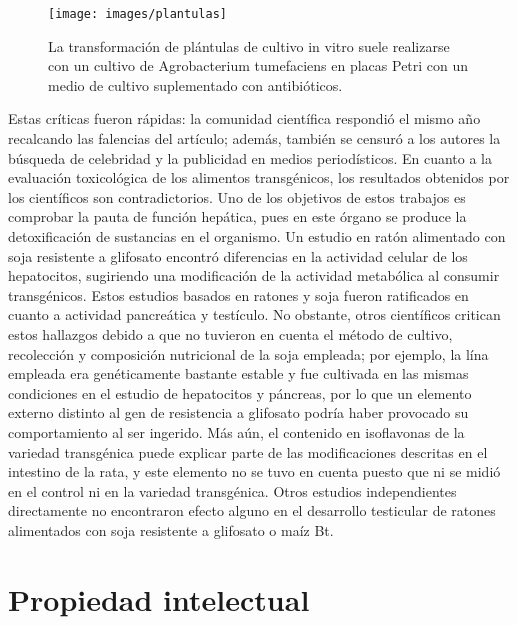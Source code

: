 \documentclass[11pt,a4paper]{article}
\begin{document}
\begin{wrapfigure}{O}{6cm}
\centering
\texttt{[image: images/plantulas]}
\caption[Cultivo in vitro]{La transformación de plántulas de cultivo in vitro suele realizarse con un cultivo de Agrobacterium tumefaciens en placas Petri con un medio de cultivo suplementado con antibióticos.}
\label{plantulas}
\end{wrapfigure}




Estas críticas fueron rápidas: la comunidad científica respondió el mismo año recalcando las falencias del artículo; además, también se censuró a los autores la búsqueda de celebridad y la publicidad en medios periodísticos.
En cuanto a la evaluación toxicológica de los alimentos transgénicos, los resultados obtenidos por los científicos son contradictorios. Uno de los objetivos de estos trabajos es comprobar la pauta de función hepática, pues en este órgano se produce la detoxificación de sustancias en el organismo. Un estudio en ratón alimentado con soja resistente a glifosato encontró diferencias en la actividad celular de los hepatocitos, sugiriendo una modificación de la actividad metabólica al consumir transgénicos.
Estos estudios basados en ratones y soja fueron ratificados en cuanto a actividad pancreática y testículo. 
No obstante, otros científicos critican estos hallazgos debido a que no tuvieron en cuenta el método de cultivo, recolección y composición nutricional de la soja empleada; por ejemplo, la lína empleada era genéticamente bastante estable y fue cultivada en las mismas condiciones en el estudio de hepatocitos y páncreas, por lo que un elemento externo distinto al gen de resistencia a glifosato podría haber provocado su comportamiento al ser ingerido. Más aún, el contenido en isoflavonas de la variedad transgénica puede explicar parte de las modificaciones descritas en el intestino de la rata, y este elemento no se tuvo en cuenta puesto que ni se midió en el control ni en la variedad transgénica. 
Otros estudios independientes directamente no encontraron efecto alguno en el desarrollo testicular de ratones alimentados con soja resistente a glifosato o maíz Bt. 




\section{Propiedad intelectual}
\end{document}
